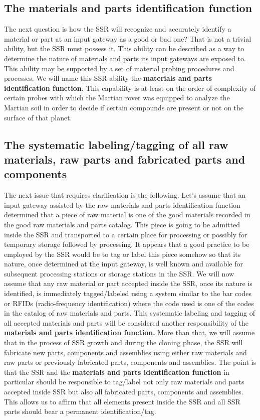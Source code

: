 \subsection[The materials and parts identification function]{The
materials and parts identification function}
\hypertarget{RefHeading3056306210128}{}The next question is how the SSR
will recognize and accurately identify a material or part at an input
gateway as a good or bad one? That is not a trivial ability, but the
SSR must possess it. This ability can be described as a way to
determine the nature of materials and parts its input gateways are
exposed to. This ability may be supported by a set of material probing
procedures and processes. We will name this SSR ability the
\textbf{materials and parts identification function}. This capability
is at least on the order of complexity of certain probes with which the
Martian rover was equipped to analyze the Martian soil in order to
decide if certain compounds are present or not on the surface of that
planet.


\bigskip

\subsection[The systematic labeling/tagging of all raw materials, raw
parts and fabricated parts and components]{The systematic
labeling/tagging of all raw materials, raw parts and fabricated parts
and components}
\hypertarget{RefHeading3058306210128}{}The next issue that requires
clarification is the following. Let’s assume that an input gateway
assisted by the raw materials and parts identification function
determined that a piece of raw material is one of the good materials
recorded in the good raw materials and parts catalog. This piece is
going to be admitted inside the SSR and transported to a certain place
for processing or possibly for temporary storage followed by
processing. It appears that a good practice to be employed by the SSR
would be to tag or label this piece somehow so that its nature, once
determined at the input gateway, is well known and available for
subsequent processing stations or storage stations in the SSR. We will
now assume that any raw material or part accepted inside the SSR, once
its nature is identified, is immediately tagged/labeled using a system
similar to the bar codes or RFIDs (radio-frequency identification)
where the code used is one of the codes in the catalog of raw materials
and parts. This systematic labeling and tagging of all accepted
materials and parts will be considered another responsibility of the
\textbf{materials and parts identification function. }More than that,
we will assume that in the process of SSR growth and during the cloning
phase, the SSR will fabricate new parts, components and assemblies
using either raw materials and raw parts or previously fabricated
parts, components and assemblies. The point is that the SSR and the
\textbf{materials and parts identification function }in
particular\textbf{ }should be responsible to\textbf{ }tag/label not
only raw materials and parts accepted inside SSR but also all
fabricated parts, components and assemblies. This allows us to affirm
that all elements present inside the SSR and all SSR parts should bear
a permanent identification/tag.


